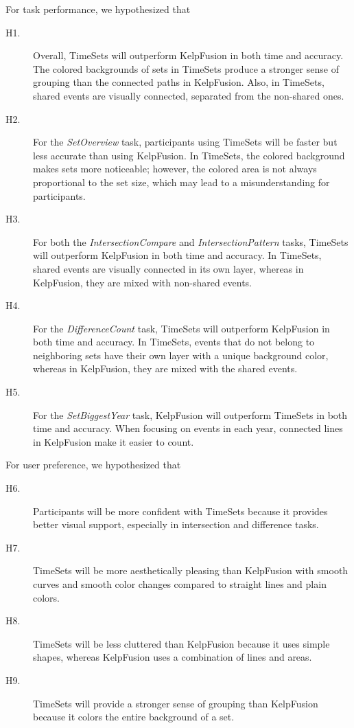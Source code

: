 For task performance, we hypothesized that
\begin{description}
	\item [H1.] Overall, TimeSets will outperform KelpFusion in both time and accuracy. The colored backgrounds of sets in TimeSets produce a stronger sense of grouping than the connected paths in KelpFusion. Also, in TimeSets, shared events are visually connected, separated from the non-shared ones.

	\item [H2.] For the \emph{SetOverview} task, participants using TimeSets will be faster but less accurate than using KelpFusion. In TimeSets, the colored background makes sets more noticeable; however, the colored area is not always proportional to the set size, which may lead to a misunderstanding for participants.

	\item [H3.] For both the \emph{IntersectionCompare} and \emph{IntersectionPattern} tasks, TimeSets will outperform KelpFusion in both time and accuracy. In TimeSets, shared events are visually connected in its own layer, whereas in KelpFusion, they are mixed with non-shared events.

	\item [H4.] For the \emph{DifferenceCount} task, TimeSets will outperform KelpFusion in both time and accuracy. In TimeSets, events that do not belong to neighboring sets have their own layer with a unique background color, whereas in KelpFusion, they are mixed with the shared events.

	\item [H5.] For the \emph{SetBiggestYear} task, KelpFusion will outperform TimeSets in both time and accuracy. When focusing on events in each year, connected lines in KelpFusion make it easier to count.
\end{description}

For user preference, we hypothesized that
\begin{description}
	\item [H6.] Participants will be more confident with TimeSets because it provides better visual support, especially in intersection and difference tasks.

	\item [H7.] TimeSets will be more aesthetically pleasing than KelpFusion with smooth curves and smooth color changes compared to straight lines and plain colors.

	\item [H8.] TimeSets will be less cluttered than KelpFusion because it uses simple shapes, whereas KelpFusion uses a combination of lines and areas.

	\item [H9.] TimeSets will provide a stronger sense of grouping than KelpFusion because it colors the entire background of a set.
\end{description}

